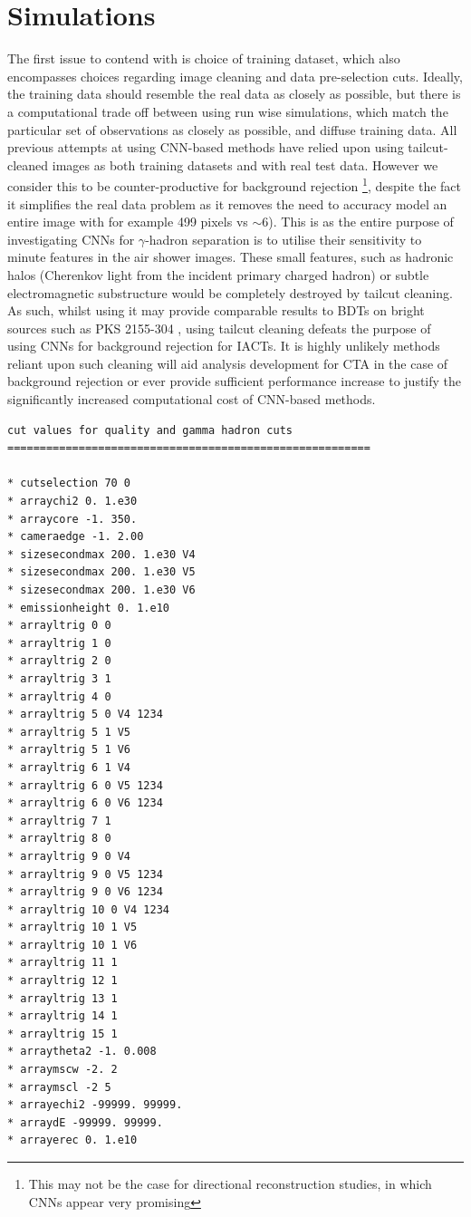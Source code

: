 \section{Simulations}
The first issue to contend with is choice of training dataset, which also encompasses choices regarding image cleaning and data pre-selection cuts. Ideally, the training data should resemble the real data as closely as possible, but there is a computational trade off between using run wise simulations, which match the particular set of observations as closely as possible, and diffuse training data. All previous attempts at using CNN-based methods have relied upon using tailcut-cleaned images \cite{Shilon} as both training datasets and with real test data. However we consider this to be counter-productive for background rejection \footnote{This may not be the case for directional reconstruction studies, in which CNNs appear very promising}, despite the fact it simplifies the real data problem as it removes the need to accuracy model an entire image with for example 499 pixels vs $\sim$6). This is as the entire purpose of investigating CNNs for $\gamma$-hadron separation is to utilise their sensitivity to minute features in the air shower images. These small features, such as hadronic halos \cite{model++}(Cherenkov light from the incident primary charged hadron) or subtle electromagnetic substructure would be completely destroyed by tailcut cleaning. As such, whilst using it may provide comparable results to BDTs on bright sources such as PKS 2155-304 \cite{Shilon}, using tailcut cleaning defeats the purpose of using CNNs for background rejection for IACTs. It is highly unlikely methods reliant upon such cleaning will aid analysis development for CTA in the case of background rejection or ever provide sufficient performance increase to justify the significantly increased computational cost of CNN-based methods.

\begin{lstlisting}[label=verb1,caption=Cut Description Used for the Real Data Analysis in Eventdisplay format,float,frame=tb]
cut values for quality and gamma hadron cuts
========================================================

* cutselection 70 0
* arraychi2 0. 1.e30
* arraycore -1. 350.
* cameraedge -1. 2.00
* sizesecondmax 200. 1.e30 V4
* sizesecondmax 200. 1.e30 V5
* sizesecondmax 200. 1.e30 V6
* emissionheight 0. 1.e10
* arrayltrig 0 0
* arrayltrig 1 0
* arrayltrig 2 0
* arrayltrig 3 1
* arrayltrig 4 0
* arrayltrig 5 0 V4 1234
* arrayltrig 5 1 V5
* arrayltrig 5 1 V6
* arrayltrig 6 1 V4
* arrayltrig 6 0 V5 1234
* arrayltrig 6 0 V6 1234
* arrayltrig 7 1
* arrayltrig 8 0
* arrayltrig 9 0 V4
* arrayltrig 9 0 V5 1234
* arrayltrig 9 0 V6 1234
* arrayltrig 10 0 V4 1234
* arrayltrig 10 1 V5
* arrayltrig 10 1 V6
* arrayltrig 11 1
* arrayltrig 12 1
* arrayltrig 13 1
* arrayltrig 14 1
* arrayltrig 15 1
* arraytheta2 -1. 0.008
* arraymscw -2. 2
* arraymscl -2 5
* arrayechi2 -99999. 99999.
* arraydE -99999. 99999.
* arrayerec 0. 1.e10
\end{lstlisting}


